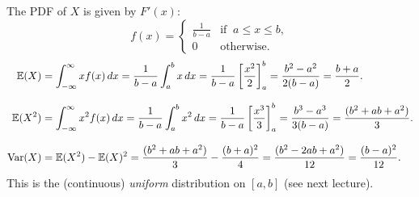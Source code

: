 \begin{solution}
The PDF of $X$ is given by $F'(x)$:
\[
f(x) = \begin{cases}
	\displaystyle\frac{1}{b-a}	& \text{if }\ a\leq x\leq b, \\[0ex]
	0				& \text{otherwise.}
\end{cases}	
\]
\begin{align*}
\mathbb{E}(X)
	& = \int_{-\infty}^{\infty}x f(x)\,dx
	= \frac{1}{b-a}\int_{a}^{b}x\,dx
	= \frac{1}{b-a}\left[\frac{x^2}{2}\right] _{a}^{b}
	= \frac{b^2-a^2}{2(b-a)}
	= \frac{b+a}{2}. \\[2ex]
\mathbb{E}(X^2)
	& = \int_{-\infty}^{\infty} x^2 f(x)\,dx
	= \frac{1}{b-a}\int_{a}^{b} x^2\,dx 
	= \frac{1}{b-a}\left[\frac{x^3}{3}\right]_{a}^{b}
	= \frac{b^{3}-a^{3}}{3(b-a)}
	= \frac{(b^{2}+ab+a^{2})}{3}. \\[2ex]
\text{Var}(X)
	& = \mathbb{E}(X^2) - \mathbb{E}(X)^2 
	= \frac{(b^{2}+ab+a^{2})}{3} - \frac{(b+a)^{2}}{4} 
	= \frac{(b^{2}-2ab+a^{2})}{12}
	= \frac{(b-a)^{2}}{12}.
\end{align*}
This is the (continuous) \emph{uniform} distribution on $[a,b]$ (see next lecture). 
\end{solution}

